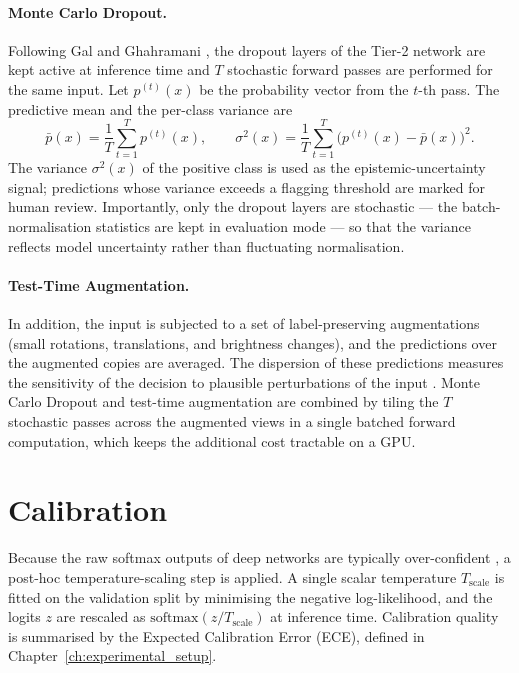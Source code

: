 \paragraph{Monte Carlo Dropout.} Following Gal and Ghahramani \cite{gal2016dropout}, the dropout layers of the Tier-2 network are kept active at inference time and $T$ stochastic forward passes are performed for the same input. Let $p^{(t)}(x)$ be the probability vector from the $t$-th pass. The predictive mean and the per-class variance are
\begin{equation}
    \bar{p}(x) = \frac{1}{T}\sum_{t=1}^{T} p^{(t)}(x),
    \qquad
    \sigma^2(x) = \frac{1}{T}\sum_{t=1}^{T}\big(p^{(t)}(x) - \bar{p}(x)\big)^2 .
\end{equation}
The variance $\sigma^2(x)$ of the positive class is used as the epistemic-uncertainty signal; predictions whose variance exceeds a flagging threshold are marked for human review. Importantly, only the dropout layers are stochastic --- the batch-normalisation statistics are kept in evaluation mode --- so that the variance reflects model uncertainty rather than fluctuating normalisation.

\paragraph{Test-Time Augmentation.} In addition, the input is subjected to a set of label-preserving augmentations (small rotations, translations, and brightness changes), and the predictions over the augmented copies are averaged. The dispersion of these predictions measures the sensitivity of the decision to plausible perturbations of the input \cite{wang2019aleatoric}. Monte Carlo Dropout and test-time augmentation are combined by tiling the $T$ stochastic passes across the augmented views in a single batched forward computation, which keeps the additional cost tractable on a GPU.

\section{Calibration}
\label{sec:calibration}
Because the raw softmax outputs of deep networks are typically over-confident \cite{guo2017calibration}, a post-hoc temperature-scaling step is applied. A single scalar temperature $T_{\text{scale}}$ is fitted on the validation split by minimising the negative log-likelihood, and the logits $z$ are rescaled as $\mathrm{softmax}(z / T_{\text{scale}})$ at inference time. Calibration quality is summarised by the Expected Calibration Error (ECE), defined in Chapter~\ref{ch:experimental_setup}.

